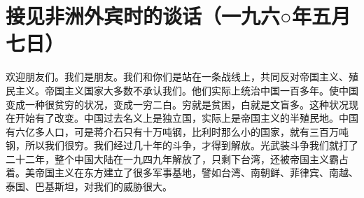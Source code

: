\section[接见非洲外宾时的谈话（一九六○年五月七日）]{接见非洲外宾时的谈话（一九六○年五月七日）}


欢迎朋友们。我们是朋友。我们和你们是站在一条战线上，共同反对帝国主义、殖民主义。帝国主义国家大多数不承认我们。他们实际上统治中国一百多年。使中国变成一种很贫穷的状况，变成一穷二白。穷就是贫困，白就是文盲多。这种状况现在开始有了改变。中国过去名义上是独立国，实际上是帝国主义的半殖民地。中国有六亿多人口，可是蒋介石只有十万吨钢，比利时那么小的国家，就有三百万吨钢，所以我们很穷。我们经过几十年的斗争，才得到解放。光武装斗争我们就打了二十二年，整个中国大陆在一九四九年解放了，只剩下台湾，还被帝国主义霸占着。美帝国主义在东方建立了很多军事基地，譬如台湾、南朝鲜、菲律宾、南越、泰国、巴基斯坦，对我们的威胁很大。

